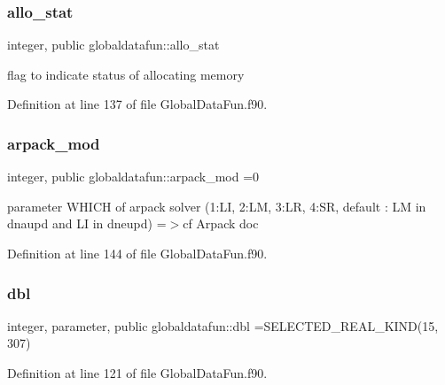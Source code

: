 \subsubsection{\texorpdfstring{allo\+\_\+stat}{allo\_stat}}
{\footnotesize\ttfamily integer, public globaldatafun\+::allo\+\_\+stat}



flag to indicate status of allocating memory 



Definition at line 137 of file Global\+Data\+Fun.\+f90.

\mbox{\label{namespaceglobaldatafun_ac1ee1084ba0c21ae53df281847753757}} 
\subsubsection{\texorpdfstring{arpack\+\_\+mod}{arpack\_mod}}
{\footnotesize\ttfamily integer, public globaldatafun\+::arpack\+\_\+mod =0}



parameter W\+H\+I\+CH of arpack solver (1\+:LI, 2\+:LM, 3\+:LR, 4\+:SR, default \+: LM in dnaupd and LI in dneupd) =$>$cf Arpack doc 



Definition at line 144 of file Global\+Data\+Fun.\+f90.

\mbox{\label{namespaceglobaldatafun_a5008801201dd34f2af8eae07756befb4}} 
\subsubsection{\texorpdfstring{dbl}{dbl}}
{\footnotesize\ttfamily integer, parameter, public globaldatafun\+::dbl =S\+E\+L\+E\+C\+T\+E\+D\+\_\+\+R\+E\+A\+L\+\_\+\+K\+I\+ND(15, 307)}



Definition at line 121 of file Global\+Data\+Fun.\+f90.

\mbox{\label{namespaceglobaldatafun_a6cd96b1c5754b6f19020fd2ff826086d}} 
